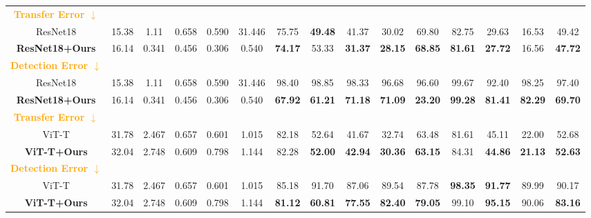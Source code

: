 \begin{table*}[t]
{\begin{tabular}{cc|cccc|ccccccccc}
    \hline \hline
    \textbf{\textcolor{orange}{Transfer Error $\downarrow$}} \\
    ResNet18 & 15.38 & 1.11 & 0.658 & 0.590 & 31.446 & 75.75 & \textbf{49.48} & 41.37 & 30.02 & 69.80 & 82.75 & 29.63 & 16.53 & 49.42 \\

    \rowcolor{yellow!50}
    \textbf{ResNet18+Ours} & 16.14 & 0.341 & 0.456 & 0.306 & 0.540 & \textbf{74.17} & 53.33 & \textbf{31.37} & \textbf{28.15} & \textbf{68.85} & \textbf{81.61} & \textbf{27.72} & 16.56 & \textbf{47.72} \\

    \hline %
    \textbf{\textcolor{orange}{Detection Error $\downarrow$}} \\
    ResNet18 & 15.38 & 1.11 & 0.658 & 0.590 & 31.446 & 98.40 & 98.85 & 98.33 & 96.68 & 96.60 & 99.67 & 92.40 & 98.25 & 97.40 \\

    \rowcolor{yellow!50}
    \textbf{ResNet18+Ours} & 16.14 & 0.341 & 0.456 & 0.306 & 0.540 & \textbf{67.92} & \textbf{61.21} & \textbf{71.18} & \textbf{71.09} & \textbf{23.20} & \textbf{99.28} & \textbf{81.41} & \textbf{82.29} & \textbf{69.70} \\
    \hline \hline

    
    \textbf{\textcolor{orange}{Transfer Error $\downarrow$}} \\
    ViT-T & 31.78 & 2.467 & 0.657 & 0.601 & 1.015 & 82.18 & 52.64 & 41.67 & 32.74 & 63.48 & 81.61 & 45.11 & 22.00 & 52.68 \\

    \rowcolor{yellow!50}
    \textbf{ViT-T+Ours} & 32.04 & 2.748 & 0.609 & 0.798 & 1.144 & 82.28 & \textbf{52.00} & \textbf{42.94} & \textbf{30.36} & \textbf{63.15} & 84.31 & \textbf{44.86} & \textbf{21.13} & \textbf{52.63} \\

    \hline %
    \textbf{\textcolor{orange}{Detection Error $\downarrow$}} \\
    ViT-T & 31.78 & 2.467 & 0.657 & 0.601 & 1.015 & 85.18 & 91.70 & 87.06 & 89.54 & 87.78 & \textbf{98.35} & \textbf{91.77} & 89.99 & 90.17 \\

    \rowcolor{yellow!50}
    \textbf{ViT-T+Ours} & 32.04 & 2.748 & 0.609 & 0.798 & 1.144 & \textbf{81.12} & \textbf{60.81} & \textbf{77.55} & \textbf{82.40} & \textbf{79.05} & 99.10 & \textbf{95.15} & 90.06 & \textbf{83.16} \\
    
    \bottomrule
    \end{tabular}}
\end{table*}
